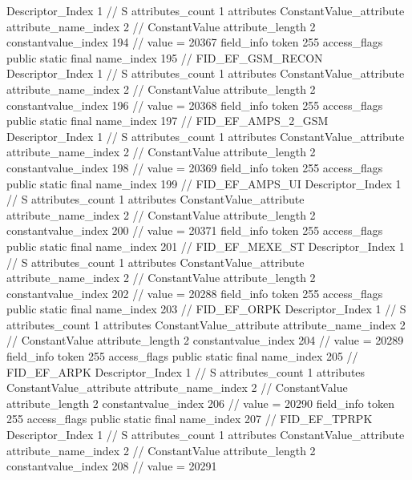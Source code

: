 {{{{{				Descriptor_Index	1		// S
				attributes_count	1
				attributes {
				ConstantValue_attribute {
					attribute_name_index	2		// ConstantValue
					attribute_length	2
					constantvalue_index	194		// value = 20367
				}
				}
			}
			field_info {
				token	255
				access_flags	public static final
				name_index	195		// FID_EF_GSM_RECON
				Descriptor_Index	1		// S
				attributes_count	1
				attributes {
				ConstantValue_attribute {
					attribute_name_index	2		// ConstantValue
					attribute_length	2
					constantvalue_index	196		// value = 20368
				}
				}
			}
			field_info {
				token	255
				access_flags	public static final
				name_index	197		// FID_EF_AMPS_2_GSM
				Descriptor_Index	1		// S
				attributes_count	1
				attributes {
				ConstantValue_attribute {
					attribute_name_index	2		// ConstantValue
					attribute_length	2
					constantvalue_index	198		// value = 20369
				}
				}
			}
			field_info {
				token	255
				access_flags	public static final
				name_index	199		// FID_EF_AMPS_UI
				Descriptor_Index	1		// S
				attributes_count	1
				attributes {
				ConstantValue_attribute {
					attribute_name_index	2		// ConstantValue
					attribute_length	2
					constantvalue_index	200		// value = 20371
				}
				}
			}
			field_info {
				token	255
				access_flags	public static final
				name_index	201		// FID_EF_MEXE_ST
				Descriptor_Index	1		// S
				attributes_count	1
				attributes {
				ConstantValue_attribute {
					attribute_name_index	2		// ConstantValue
					attribute_length	2
					constantvalue_index	202		// value = 20288
				}
				}
			}
			field_info {
				token	255
				access_flags	public static final
				name_index	203		// FID_EF_ORPK
				Descriptor_Index	1		// S
				attributes_count	1
				attributes {
				ConstantValue_attribute {
					attribute_name_index	2		// ConstantValue
					attribute_length	2
					constantvalue_index	204		// value = 20289
				}
				}
			}
			field_info {
				token	255
				access_flags	public static final
				name_index	205		// FID_EF_ARPK
				Descriptor_Index	1		// S
				attributes_count	1
				attributes {
				ConstantValue_attribute {
					attribute_name_index	2		// ConstantValue
					attribute_length	2
					constantvalue_index	206		// value = 20290
				}
				}
			}
			field_info {
				token	255
				access_flags	public static final
				name_index	207		// FID_EF_TPRPK
				Descriptor_Index	1		// S
				attributes_count	1
				attributes {
				ConstantValue_attribute {
					attribute_name_index	2		// ConstantValue
					attribute_length	2
					constantvalue_index	208		// value = 20291
				}
				}
			}
			}
}}}
